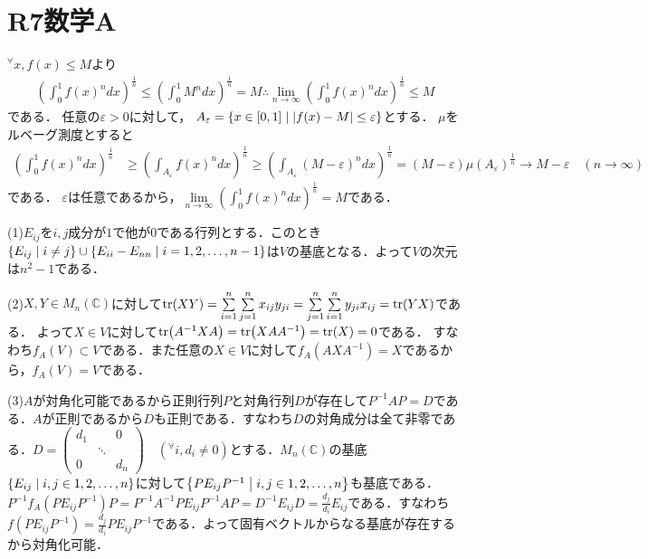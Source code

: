 \documentclass[
		book,
		head_space=20mm,
		foot_space=20mm,
		gutter=10mm,
		line_length=190mm
]{jlreq}
\begin{document}
\section{R7数学A}
$^\forall x ,f(x)\le M$より
\begin{align}
    \left( \int_0^1 f(x)^ndx \right)^{\frac{1}{n}} \le \left( \int_0^1 M^ndx \right)^{\frac{1}{n}} = M \therefore \lim_{n\rightarrow \infty} \left( \int_0^1 f(x)^ndx \right)^{\frac{1}{n}} \le M
\end{align}
である．
任意の$\varepsilon > 0$に対して，
$A_{\varepsilon}=\left\{ x\in [0,1]\mathrel{}\middle|\mathrel{} |f(x)-M|\le\varepsilon\right\}$とする．
$\mu$をルベーグ測度とすると
\begin{align}
    \left( \int_0^1 f(x)^ndx \right)^{\frac{1}{n}} &\ge \left( \int_{A_{\varepsilon}} f(x)^ndx \right)^{\frac{1}{n}} \ge \left( \int_{A_{\varepsilon}} (M-\varepsilon)^ndx \right)^{\frac{1}{n}} = (M-\varepsilon)\mu(A_{\varepsilon})^{\frac{1}{n}}\rightarrow M-\varepsilon \quad (n\rightarrow \infty)
\end{align}である．
$\varepsilon$は任意であるから，$\lim\limits_{n\rightarrow \infty} \left( \int_0^1 f(x)^ndx \right)^{\frac{1}{n}} = M$である．

(1)$E_{ij}$を$i,j$成分が$1$で他が$0$である行列とする．このとき
$\left\{ E_{ij}\mathrel{}\middle|\mathrel{}i\neq j \right\}\cup \left\{ E_{ii}-E_{nn}\mathrel{}\middle|\mathrel{} i=1,2,\dots,n-1\right\}$は$V$の基底となる．よって$V$の次元は$n^2-1$である．

(2)$X,Y\in M_n(\mathbb{C})$に対して$\tr(XY)=\sum\limits_{i=1}^n \sum\limits_{j=1}^n x_{ij}y_{ji}= \sum\limits_{j=1}^n \sum\limits_{i=1}^n y_{ji}x_{ij}=\tr(YX)$である．
よって$X \in V$に対して$\tr(A^{-1}XA)=\tr(XAA^{-1})=\tr(X)=0$である．
すなわち$f_A(V)\subset V$である．また任意の$X\in V$に対して$f_A(AXA^{-1})=X$であるから，$f_A(V)=V$である．

(3)$A$が対角化可能であるから正則行列$P$と対角行列$D$が存在して$P^{-1}AP=D$である．$A$が正則であるから$D$も正則である．すなわち$D$の対角成分は全て非零である．$D=\begin{pmatrix}
    d_1 & & 0\\
    & \ddots & \\
    0 & & d_n
\end{pmatrix}\quad(^\forall i,d_i\neq 0)$とする．$M_n(\mathbb{C})$の基底$\left\{ E_{ij}\mathrel{}\middle|\mathrel{} i,j \in 1,2,\dots,n\right\}$に対して$\left\{ PE_{ij}P^{-1}\mathrel{}\middle|\mathrel{} i,j \in 1,2,\dots,n\right\}$も基底である．
$P^{-1}f_A(PE_{ij}P^{-1})P=P^{-1}A^{-1}PE_{ij}P^{-1}AP=D^{-1}E_{ij}D=\frac{d_j}{d_i}E_{ij}$である．すなわち$f(PE_{ij}P^{-1})=\frac{d_j}{d_i}PE_{ij}P^{-1}$である．よって固有ベクトルからなる基底が存在するから対角化可能．
\end{document}
